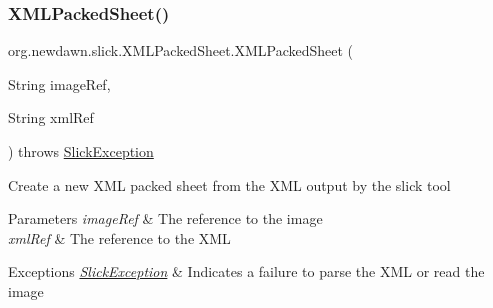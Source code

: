 \subsubsection{\texorpdfstring{X\+M\+L\+Packed\+Sheet()}{XMLPackedSheet()}}
{\footnotesize\ttfamily org.\+newdawn.\+slick.\+X\+M\+L\+Packed\+Sheet.\+X\+M\+L\+Packed\+Sheet (\begin{DoxyParamCaption}\item[{String}]{image\+Ref,  }\item[{String}]{xml\+Ref }\end{DoxyParamCaption}) throws \mbox{\hyperlink{classorg_1_1newdawn_1_1slick_1_1_slick_exception}{Slick\+Exception}}\hspace{0.3cm}{\ttfamily [inline]}}

Create a new X\+ML packed sheet from the X\+ML output by the slick tool


\begin{DoxyParams}{Parameters}
{\em image\+Ref} & The reference to the image \\
\hline
{\em xml\+Ref} & The reference to the X\+ML \\
\hline
\end{DoxyParams}

\begin{DoxyExceptions}{Exceptions}
{\em \mbox{\hyperlink{classorg_1_1newdawn_1_1slick_1_1_slick_exception}{Slick\+Exception}}} & Indicates a failure to parse the X\+ML or read the image \\
\hline
\end{DoxyExceptions}

